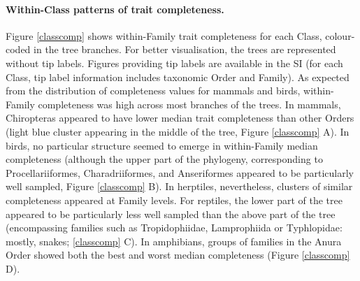 \paragraph{Within-Class patterns of trait completeness.}
Figure \ref{classcomp} shows within-Family trait completeness for each Class, colour-coded in the tree branches. For better visualisation, the trees are represented without tip labels. Figures providing tip labels are available in the SI (for each Class, tip label information includes taxonomic Order and Family). As expected from the distribution of completeness values for mammals and birds, within-Family completeness was high across most branches of the trees. In mammals, Chiropteras appeared to have lower median trait completeness than other Orders (light blue cluster appearing in the middle of the tree, Figure \ref{classcomp} A). In birds, no particular structure seemed to emerge in within-Family median completeness (although the upper part of the phylogeny, corresponding to Procellariiformes, Charadriiformes, and Anseriformes appeared to be particularly well sampled, Figure \ref{classcomp} B). In herptiles, nevertheless, clusters of similar completeness appeared at Family levels. For reptiles, the lower part of the tree appeared to be particularly less well sampled than the above part of the tree (encompassing families such as Tropidophiidae, Lamprophiida or Typhlopidae: mostly, snakes; \ref{classcomp} C). In amphibians, groups of families in the Anura Order showed both the best and worst median completeness (Figure \ref{classcomp} D). 

